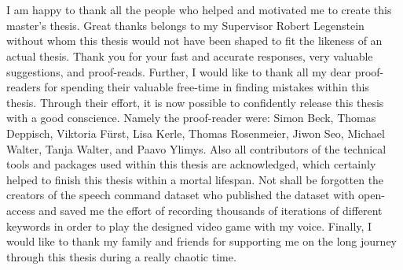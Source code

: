
\chapter*{}
I am happy to thank all the people who helped and motivated me to create this master's thesis.
Great thanks belongs to my Supervisor Robert Legenstein without whom this thesis would not have been shaped to fit the likeness of an actual thesis.
Thank you for your fast and accurate responses, very valuable suggestions, and proof-reads.
Further, I would like to thank all my dear proof-readers for spending their valuable free-time in finding mistakes within this thesis.
Through their effort, it is now possible to confidently release this thesis with a good conscience.
Namely the proof-reader were: Simon Beck, Thomas Deppisch, Viktoria Fürst, Lisa Kerle, Thomas Rosenmeier, Jiwon Seo, Michael Walter, Tanja Walter, and Paavo Ylimys.
Also all contributors of the technical tools and packages used within this thesis are acknowledged, which certainly helped to finish this thesis within a mortal lifespan.
Not shall be forgotten the creators of the speech command dataset who published the dataset with open-access and saved me the effort of recording thousands of iterations of different keywords in order to play the designed video game with my voice.
Finally, I would like to thank my family and friends for supporting me on the long journey through this thesis during a really chaotic time.